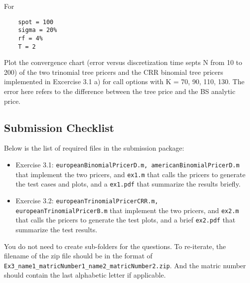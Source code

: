\documentclass[12pt,a4paper,hidelinks,fleqn]{article}            %
\begin{document}
For 
\vspace{-1cm} 
\begin{verbatim}
    spot = 100
    sigma = 20%
    rf = 4%
    T = 2
\end{verbatim} 

Plot the convergence chart (error versus discretization time septs N from 10 to 200) of the two trinomial tree pricers and the CRR binomial tree pricers implemented in Excercise 3.1 a) for call options with K = 70, 90, 110, 130.
The error here refers to the difference between the tree price and the BS analytic price.

\subsection*{Submission Checklist}
Below is the list of required files in the submission package:
\begin{itemize}
\item Exercise 3.1: \verb=europeanBinomialPricerD.m, americanBinomialPricerD.m= that implement the two pricers, and \verb=ex1.m= that calls the pricers to generate the test cases and plots, and a \verb=ex1.pdf= that summarize the results briefly.
\item Exercise 3.2: \verb=europeanTrinomialPricerCRR.m, europeanTrinomialPricerB.m= that implement the two pricers, and \verb=ex2.m= that calls the pricers to generate the test plots, and a brief \verb=ex2.pdf= that summarize the test results.
\end{itemize}
You do not need to create sub-folders for the questions. 
To re-iterate, the filename of the zip file should be in the format of \verb=Ex3_name1_matricNumber1_name2_matricNumber2.zip=.
And the matric number should contain the last alphabetic letter if applicable. 
\end{document}
